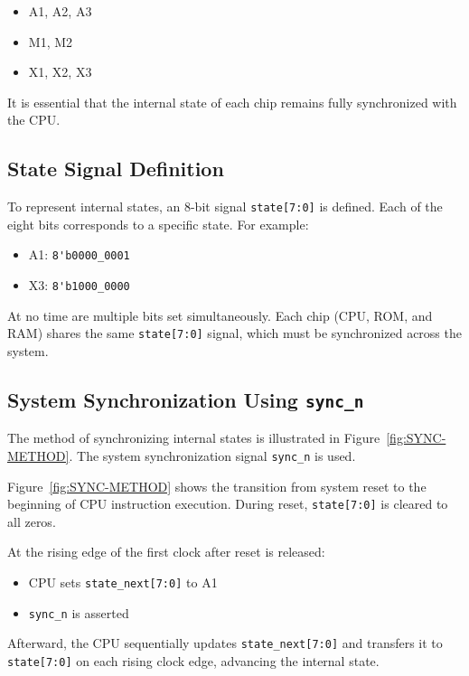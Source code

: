 \begin{itemize}
  \item A1, A2, A3
  \item M1, M2
  \item X1, X2, X3
\end{itemize}

It is essential that the internal state of each chip remains fully synchronized with the CPU.
\subsection{State Signal Definition}
To represent internal states, an 8-bit signal \verb|state[7:0]| is defined. Each of the eight bits corresponds to a specific state. For example:

\begin{itemize}
  \item A1: \verb|8'b0000_0001|
  \item X3: \verb|8'b1000_0000|
\end{itemize}

At no time are multiple bits set simultaneously.
Each chip (CPU, ROM, and RAM) shares the same \verb|state[7:0]| signal, which must be synchronized across the system.

\subsection{System Synchronization Using \texttt{sync\_n}}
The method of synchronizing internal states is illustrated in Figure~\ref{fig:SYNC-METHOD}. The system synchronization signal \verb|sync_n| is used.

Figure~\ref{fig:SYNC-METHOD} shows the transition from system reset to the beginning of CPU instruction execution. During reset, \verb|state[7:0]| is cleared to all zeros.

At the rising edge of the first clock after reset is released:
\begin{itemize}
  \item CPU sets \verb|state_next[7:0]| to A1
  \item \verb|sync_n| is asserted
\end{itemize}

Afterward, the CPU sequentially updates \verb|state_next[7:0]| and transfers it to \verb|state[7:0]| on each rising clock edge, advancing the internal state.

